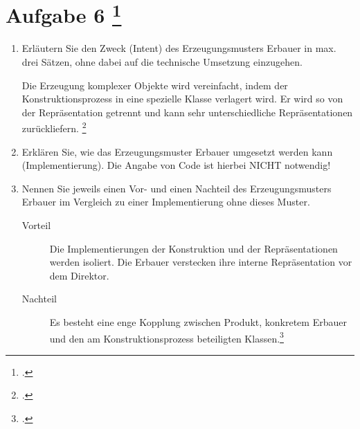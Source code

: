 \documentclass{lehramt-informatik-aufgabe}
\begin{document}
\section{Aufgabe 6
\footcite{examen:66116:2021:03}}
\begin{enumerate}


\item Erläutern Sie den Zweck (Intent) des Erzeugungsmusters Erbauer in
max. drei Sätzen, ohne dabei auf die technische Umsetzung einzugehen.

\begin{liAntwort}
Die Erzeugung komplexer Objekte wird vereinfacht, indem der
Konstruktionsprozess in eine spezielle Klasse verlagert wird. Er wird so
von der Repräsentation getrennt und kann sehr unterschiedliche
Repräsentationen zurückliefern.
\footcite[Seite 29]{eilebrecht}
\end{liAntwort}


\item Erklären Sie, wie das Erzeugungsmuster Erbauer umgesetzt werden
kann (Implementierung). Die Angabe von Code ist hierbei NICHT notwendig!


\item Nennen Sie jeweils einen Vor- und einen Nachteil des
Erzeugungsmusters Erbauer im Vergleich zu einer Implementierung ohne
dieses Muster.

\begin{liAntwort}
\begin{description}
\item[Vorteil]

Die Implementierungen der Konstruktion und der Repräsentationen werden
isoliert. Die Erbauer verstecken ihre interne Repräsentation vor dem
Direktor.

\item[Nachteil]

Es besteht eine enge Kopplung zwischen Produkt, konkretem Erbauer und
den am Konstruktionsprozess beteiligten Klassen.\footcite{wiki:erbauer}
\end{description}
\end{liAntwort}

\end{enumerate}

\begin{liExkurs}
\liEntwurfsErbauerUml

\liEntwurfsErbauerAkteure
\end{liExkurs}
\end{document}
